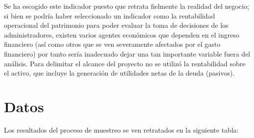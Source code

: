 \documentclass[12pt,a4paper,twoside]{article}
\begin{document}
Se ha escogido este indicador puesto que retrata fielmente la realidad del negocio; si bien se podría haber seleccionado un indicador como la rentabilidad operacional del patrimonio para poder evaluar la toma de decisiones de los administradores, existen varios agentes económicos que dependen en el ingreso financiero (así como otros que se ven severamente afectados por el gasto financiero) por tanto sería inadecuado dejar una tan importante variable fuera del análisis. Para delimitar el alcance del proyecto no se utilizó la rentabilidad sobre el activo, que incluye la generación de utilidades netas de la deuda (pasivos).
\clearpage
\section{Datos}
Los resultados del proceso de muestreo se ven retratados en la siguiente tabla:
\end{document}
